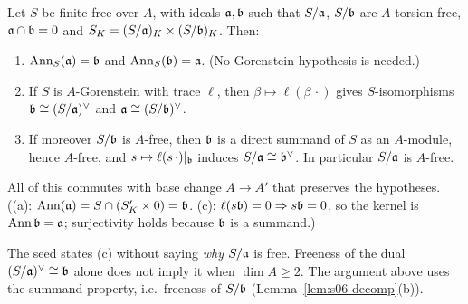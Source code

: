 \begin{lemma}\label{lem:s06-D}
Let $S$ be finite free over $A$, with ideals $\mathfrak{a},\mathfrak{b}$ such that $S/\mathfrak{a}$, $S/\mathfrak{b}$ are $A$-torsion-free, $\mathfrak{a}\cap\mathfrak{b}=0$ and
$S_K=(S/\mathfrak{a})_K\times(S/\mathfrak{b})_K$. Then:
\begin{enumerate}[label=(\alph*)]
\item $\operatorname{Ann}_S(\mathfrak{a})=\mathfrak{b}$ and $\operatorname{Ann}_S(\mathfrak{b})=\mathfrak{a}$. (No Gorenstein hypothesis is needed.)
\item If $S$ is $A$-Gorenstein with trace $\ell$, then $\beta\mapsto\ell(\beta\,\cdot)$ gives $S$-isomorphisms
  $\mathfrak{b}\cong(S/\mathfrak{a})^\vee$ and $\mathfrak{a}\cong(S/\mathfrak{b})^\vee$.
\item If moreover $S/\mathfrak{b}$ is $A$-free, then $\mathfrak{b}$ is a direct summand of $S$ as an $A$-module, hence $A$-free, and
  $s\mapsto\ell(s\,\cdot)|_{\mathfrak{b}}$ induces $S/\mathfrak{a}\cong\mathfrak{b}^\vee$. In particular $S/\mathfrak{a}$ is $A$-free.
\end{enumerate}
All of this commutes with base change $A\to A'$ that preserves the hypotheses. \stproved{} ((a): $\operatorname{Ann}(\mathfrak{a})=S\cap(S'_K\times0)=\mathfrak{b}$.
(c): $\ell(s\mathfrak{b})=0\Rightarrow s\mathfrak{b}=0$, so the kernel is $\operatorname{Ann}\mathfrak{b}=\mathfrak{a}$; surjectivity holds because $\mathfrak{b}$ is a summand.)
\end{lemma}
\noindent The seed states (c) without saying \emph{why} $S/\mathfrak{a}$ is free. Freeness of the dual $(S/\mathfrak{a})^\vee\cong\mathfrak{b}$ alone does not
imply it when $\dim A\ge2$. The argument above uses the summand property, i.e.\ freeness of $S/\mathfrak{b}$ (Lemma~\ref{lem:s06-decomp}(b)).

